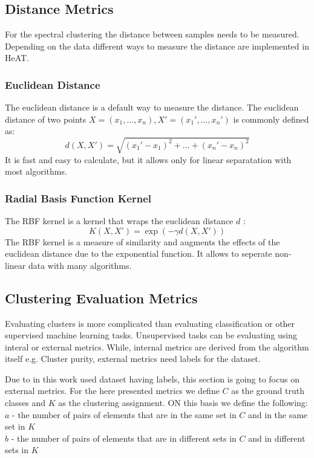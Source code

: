 \subsection{Distance Metrics}
\label{subsec:distance_metrics}
For the spectral clustering the distance between samples needs to be measured. Depending on the data different ways to measure the distance are implemented in \gls{HeAT}.

\subsubsection{Euclidean Distance}
The euclidean distance is a default way to measure the distance. The euclidean distance of two points \(X = (x_1, \ldots, x_n ), X' = (x_1', \ldots, x_n')\) is commonly defined  as:
\[
  d\left(X, X'\right) = \sqrt{{(x_1' - x_1)}^2 + \ldots + {(x_n' - x_n)}^2}
\]
It is fast and easy to calculate, but it allows only for linear separatation with most algorithms.

\subsubsection{Radial Basis Function Kernel}
The RBF kernel is a kernel that wraps the euclidean distance \(d\) \cite{vert_primer_2004}:
\[
  K\left(X, X'\right) = \exp(-\gamma d(X, X'))
\]
The RBF kernel is a measure of similarity and augments the effects of the euclidean distance due to the exponential function.
It allows to seperate non-linear data with many algorithms.


\subsection{Clustering Evaluation Metrics}
\label{subsec:clustering_evaluation_metrics}

Evaluating clusters is more complicated than evaluating classification or other supervised machine learning tasks.
Unsupervised tasks can be evaluating using interal or external metrics. While, internal metrics are derived from the algorithm itself e.g. Cluster purity, external metrics need labels for the dataset.

Due to in this work used dataset having labels, this section is going to focus on external metrics.
For the here presented metrics we define \(C\) as the ground truth classes and \(K\) as the clustering assignment.
ON this basis we define the following:\\
\(a\) - the number of pairs of elements that are in the same set in \(C\) and in the same set in \(K\)\\
\(b\) - the number of pairs of elements that are in different sets in \(C\) and in different sets in \(K\)\\


